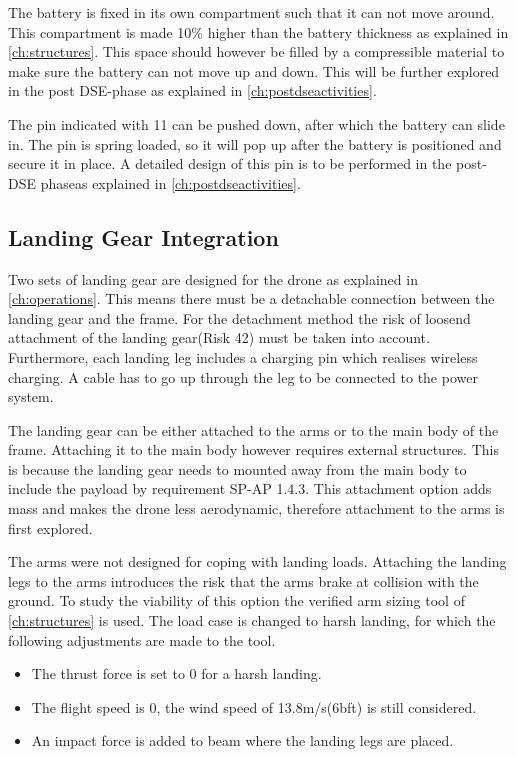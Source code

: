 The battery is fixed in its own compartment such that it can not move around. This compartment is made 10\% higher than the battery thickness as explained in \autoref{ch:structures}. This space should however be filled by a compressible material to make sure the battery can not move up and down. This will be further explored in the post DSE-phase as explained in \autoref{ch:postdseactivities}. 

The pin indicated with 11 can be pushed down, after which the battery can slide in. The pin is spring loaded, so it will pop up after the battery is positioned and secure it in place. A detailed design of this pin is to be performed in the post-DSE phaseas explained in \autoref{ch:postdseactivities}. 

\subsection{Landing Gear Integration}
Two sets of landing gear are designed for the drone as explained in \autoref{ch:operations}. This means there must be a detachable connection between the landing gear and the frame. For the detachment method the risk of loosend attachment of the landing gear(Risk 42) must be taken into account. Furthermore, each landing leg includes a charging pin which realises wireless charging. A cable has to go up through the leg to be connected to the power system.

The landing gear can be either attached to the arms or to the main body of the frame. Attaching it to the main body however requires external structures. This is because the landing gear needs to mounted away from the main body to include the payload by requirement SP-AP 1.4.3. This attachment option adds mass and makes the drone less aerodynamic, therefore attachment to the arms is first explored.

The arms were not designed for coping with landing loads. Attaching the landing legs to the arms introduces the risk that the arms brake at collision with the ground. To study the viability of this option the verified arm sizing tool of \autoref{ch:structures} is used. The load case is changed to harsh landing, for which the following adjustments are made to the tool.
\begin{itemize}[noitemsep,nolistsep]
    \item The thrust force is set to 0 for a harsh landing.
    \item The flight speed is 0, the wind speed of 13.8m/s(6bft) is still considered.
    \item An impact force is added to beam where the landing legs are placed. 
\end{itemize}

